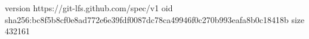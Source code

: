 version https://git-lfs.github.com/spec/v1
oid sha256:bc8f5b8cf0e8ad772e6e39fdf0087dc78ca49946f0c270b993eafa8b0c18418b
size 432161
